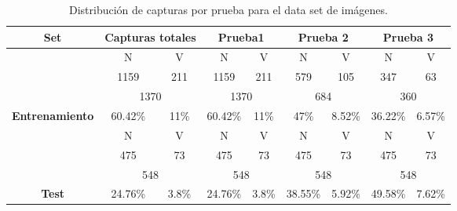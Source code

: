 \documentclass[twoside,spanish,ESP,MSc]{plantillaLabUPV}
\theoremstyle{definition}
\begin{document}
\begin{table}[h]
	\caption{Distribución de capturas por prueba para el data set de imágenes.}
	\label{imadat}
	\centering
	\begin{tabular}{|c|c|c|c|c|c|c|c|c|}
		\hline
		\textbf{Set}                               & \multicolumn{2}{c|}{\textbf{Capturas totales}}      & \multicolumn{2}{c|}{\textbf{Prueba1}}               & \multicolumn{2}{c|}{\textbf{Prueba 2}}              & \multicolumn{2}{c|}{\textbf{Prueba 3}}              \\ \hline
		& {\color[HTML]{F56B00} N} & {\color[HTML]{009901} V} & {\color[HTML]{F56B00} N} & {\color[HTML]{009901} V} & {\color[HTML]{F56B00} N} & {\color[HTML]{009901} V} & {\color[HTML]{F56B00} N} & {\color[HTML]{009901} V} \\ \cline{2-9} 
		& 1159                     & 211                      & 1159                     & 211                      & 579                        & 105                        & 347                        & 63                        \\
		\cline{2-9} 
		& \multicolumn{2}{c|}{1370}                           & \multicolumn{2}{c|}{1370}                           & \multicolumn{2}{c|}{684}                           & \multicolumn{2}{c|}{360}                           \\ \cline{2-9} 
		\multirow{-4}{*}{\textbf{Entrenamiento}}   & 60.42\%                  & 11\%                   & 60.42\%                  & 11\%                   & 47\%                      & 8.52\%                      & 36.22\%                      & 6.57\%                      \\ \hline
		& {\color[HTML]{F56B00} N} & {\color[HTML]{009901} V} & {\color[HTML]{F56B00} N} & {\color[HTML]{009901} V} & {\color[HTML]{F56B00} N} & {\color[HTML]{009901} V} & {\color[HTML]{F56B00} N} & {\color[HTML]{009901} V} \\ \cline{2-9} 
		& 475                      & 73                       & 475                      & 73                       & 475                        & 73                        & 475                        & 73                        \\
		\cline{2-9} 
		& \multicolumn{2}{c|}{548}                           & \multicolumn{2}{c|}{548}                           & \multicolumn{2}{c|}{548}                           & \multicolumn{2}{c|}{548}                           \\ \cline{2-9} 
		\multirow{-4}{*}{\textbf{Test}}            & 24.76\%                  & 3.8\%                   & 24.76\%                  & 3.8\%                   & 38.55\%                      & 5.92\%                      & 49.58\%                      & 7.62\%                      \\ \hline

\end{tabular}
\end{table}
\end{document}
